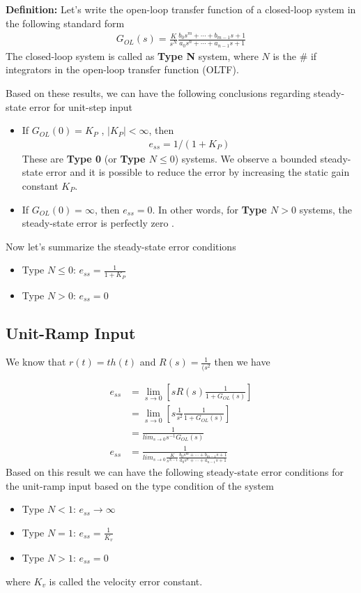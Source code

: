 \documentclass[twoside]{article}
\begin{document}
\textbf{Definition:} Let's write the open-loop transfer function of a closed-loop
system in the following standard form
%
\begin{align*}
G_{OL}(s) = \frac{K}{s^N} \frac{b_0 s^m + \cdots + b_{m-1} s + 1}{a_0 s^n + \cdots + a_{n-1} s + 1}
\end{align*}
%
The closed-loop system is called as \textbf{Type N} system, where
$N$ is the $\#$ if integrators in the open-loop transfer function (OLTF).

Based on these results, we can have the following conclusions
regarding steady-state error for unit-step input
%
\begin{itemize}
\item If $G_{OL} (0) = K_P$ , $| K_{P} | < \infty$, then 
\begin{align*}
e_{ss} =1/(1 + K_{P})
\end{align*}
% 
These are \textbf{Type 0} (or \textbf{Type $N \leq 0$})
systems. We observe a bounded steady-state error and it is possible to reduce the error by increasing the static gain
constant $K_P$. 
%
\item  If $G_{OL} (0) = \infty$, then $e_{ss} = 0$. In other words, for 
  \textbf{Type $N > 0$} systems, the steady-state error is perfectly zero .
\end{itemize}

Now let's summarize the steady-state error conditions
%
\begin{itemize}
\item Type $N \leq 0$: $e_{ss} =  \frac{1}{1 + K_{P}}$
\item Type $N > 0$: $e_{ss} = 0$
\end{itemize}

\subsection*{Unit-Ramp Input}
%
We know that $r(t) = t h(t)$ and $R(s) = \frac{1}{(s^2}$ then
we have

\begin{align*}
e_{ss} &= \lim_{s \to 0} \left[ s R(s) \frac{1}{1
         + G_{OL} (s) } \right]
\\
&= \lim_{s \to 0} \left[ s \frac{1}{s^2} \frac{1}{1
         + G_{OL} (s) } \right]
\\
 &= \frac{1}{lim_{s \to 0} s^{-1} G_{OL} (s) }
\\
e_{ss} &= \frac{1}{lim_{s \to 0} \frac{K}{s^{N-1}} \frac{b_0 s^m + \cdots + b_{m-1} s + 1}{a_0 s^n + \cdots + a_{n-1} s + 1} }
\end{align*}
%
Based on this result we can have the following steady-state
error conditions for the unit-ramp input based on the type 
condition of the system
%
\begin{itemize}
\item Type $N < 1$: $e_{ss} \to  \infty$
\item Type $N = 1$: $e_{ss} = \frac{1}{K_v}$
\item Type $N > 1$: $e_{ss} = 0$
\end{itemize}
%
where $K_v$ is called the velocity error constant.
 
\end{document}
